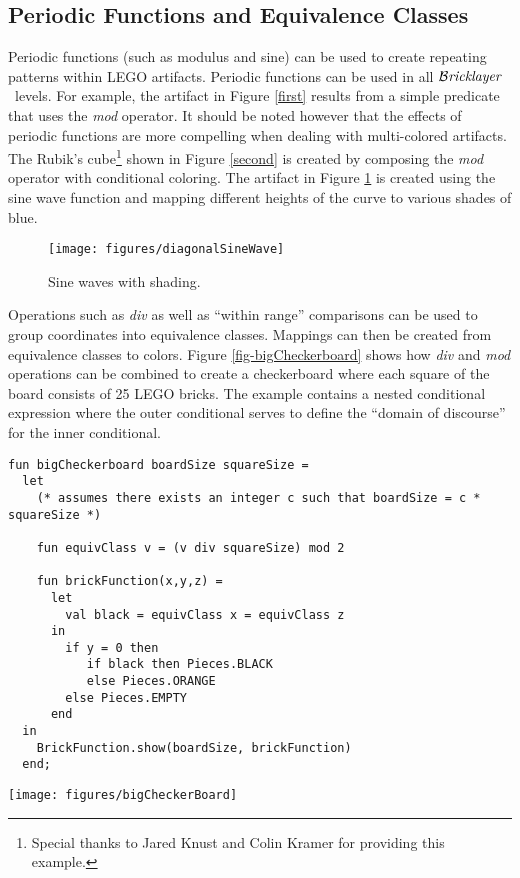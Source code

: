\documentclass[submission,copyright,creativecommons]{eptcs}
\newcommand{\bricklayer}{\ensuremath{\mathcal{B}\emph{ricklayer}}}
\begin{document}
\subsection{Periodic Functions and Equivalence Classes}
Periodic functions (such as modulus and sine) can be used to create repeating patterns within LEGO artifacts. Periodic functions can be used in all \bricklayer\ levels. For example, the artifact in Figure \ref{first} results from a simple predicate that uses the \emph{mod} operator. It should be noted however that the effects of periodic functions are more compelling when dealing with multi-colored artifacts. The Rubik's cube\footnote{Special thanks to Jared Knust and Colin Kramer for providing this example.} shown in Figure \ref{second} is created by composing the \emph{mod} operator with conditional coloring. The artifact in Figure \ref{fig-diagonalSineWaves} is created using the sine wave function and mapping different heights of the curve to various shades of blue.


\begin{figure}[htb!]
\centering
\texttt{[image: figures/diagonalSineWave]}
\caption{Sine waves with shading.}\label{fig-diagonalSineWaves}
\end{figure}


Operations such as \emph{div} as well as ``within range'' comparisons can be used to group coordinates into equivalence classes. Mappings can then be created from equivalence classes to colors. Figure \ref{fig-bigCheckerboard} shows how \emph{div} and \emph{mod} operations can be combined to create a checkerboard where each square of the board consists of 25 LEGO bricks. The example contains a nested conditional expression where the outer conditional serves to define the ``domain of discourse'' for the inner conditional.


\begin{figure*}[htb!]
\begin{lstlisting}
fun bigCheckerboard boardSize squareSize =
  let
    (* assumes there exists an integer c such that boardSize = c * squareSize *)

    fun equivClass v = (v div squareSize) mod 2

    fun brickFunction(x,y,z) =
      let
        val black = equivClass x = equivClass z
      in
        if y = 0 then
           if black then Pieces.BLACK
           else Pieces.ORANGE
        else Pieces.EMPTY
      end
  in
    BrickFunction.show(boardSize, brickFunction)
  end;
\end{lstlisting}


\begin{center}
\texttt{[image: figures/bigCheckerBoard]}
\end{center}

\caption{Using equivalence classes to create a checkerboard having big squares.}\label{fig-bigCheckerboard}
\end{figure*}
\end{document}
